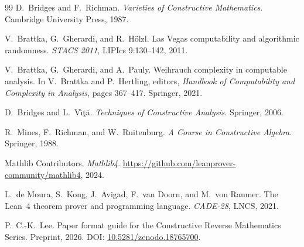 \documentclass[11pt,a4paper]{article}
\theoremstyle{plain}
\theoremstyle{definition}
\begin{document}
\begin{thebibliography}{99}
D.~Bridges and F.~Richman.
\newblock \emph{Varieties of Constructive Mathematics}.
\newblock Cambridge University Press, 1987.

V.~Brattka, G.~Gherardi, and R.~H\"olzl.
\newblock Las Vegas computability and algorithmic randomness.
\newblock \emph{STACS 2011}, LIPIcs 9:130--142, 2011.

V.~Brattka, G.~Gherardi, and A.~Pauly.
\newblock Weihrauch complexity in computable analysis.
\newblock In V.~Brattka and P.~Hertling, editors,
  \emph{Handbook of Computability and Complexity in Analysis},
  pages 367--417. Springer, 2021.

D.~Bridges and L.~V\^{\i}\c{t}\u{a}.
\newblock \emph{Techniques of Constructive Analysis}.
\newblock Springer, 2006.

R.~Mines, F.~Richman, and W.~Ruitenburg.
\newblock \emph{A Course in Constructive Algebra}.
\newblock Springer, 1988.

{Mathlib Contributors}.
\newblock \emph{Mathlib4}.
\newblock \url{https://github.com/leanprover-community/mathlib4}, 2024.

L.~{de Moura}, S.~Kong, J.~Avigad, F.~{van Doorn}, and M.~{von Raumer}.
\newblock The Lean~4 theorem prover and programming language.
\newblock \emph{CADE-28}, LNCS, 2021.

P.~C.-K.~Lee.
\newblock Paper format guide for the Constructive Reverse Mathematics Series.
\newblock Preprint, 2026.
\newblock DOI: \href{https://doi.org/10.5281/zenodo.18765700}{10.5281/zenodo.18765700}.

\end{thebibliography}
\end{document}
